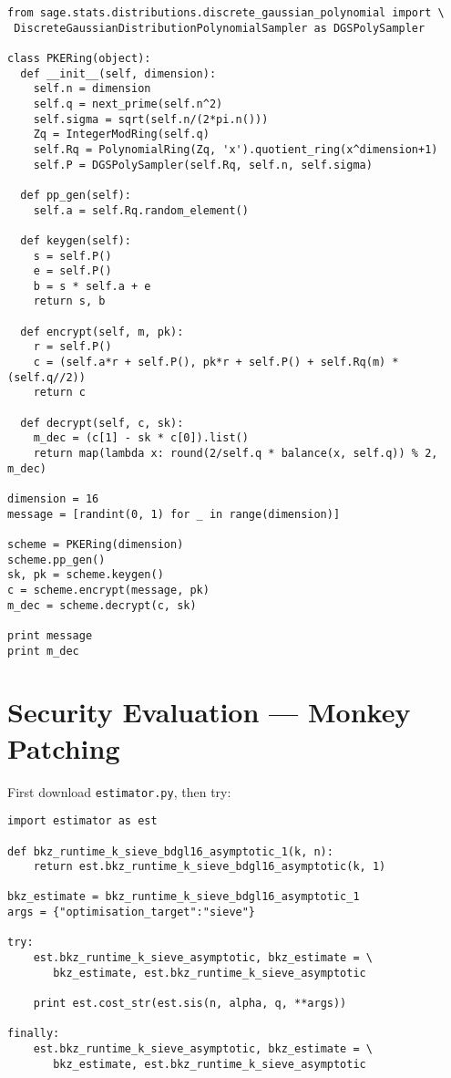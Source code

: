 \documentclass[10pt,a4paper,nobib]{tufte-handout}
\begin{document}
\lstset{language=sage,label= ,caption= ,captionpos=b,numbers=none}
\begin{lstlisting}
from sage.stats.distributions.discrete_gaussian_polynomial import \
 DiscreteGaussianDistributionPolynomialSampler as DGSPolySampler

class PKERing(object):
  def __init__(self, dimension):
    self.n = dimension
    self.q = next_prime(self.n^2)
    self.sigma = sqrt(self.n/(2*pi.n()))
    Zq = IntegerModRing(self.q)
    self.Rq = PolynomialRing(Zq, 'x').quotient_ring(x^dimension+1)
    self.P = DGSPolySampler(self.Rq, self.n, self.sigma)

  def pp_gen(self):
    self.a = self.Rq.random_element()

  def keygen(self):
    s = self.P()
    e = self.P()
    b = s * self.a + e
    return s, b

  def encrypt(self, m, pk):
    r = self.P()
    c = (self.a*r + self.P(), pk*r + self.P() + self.Rq(m) * (self.q//2))
    return c

  def decrypt(self, c, sk):
    m_dec = (c[1] - sk * c[0]).list()
    return map(lambda x: round(2/self.q * balance(x, self.q)) % 2, m_dec)

dimension = 16
message = [randint(0, 1) for _ in range(dimension)]

scheme = PKERing(dimension)
scheme.pp_gen()
sk, pk = scheme.keygen()
c = scheme.encrypt(message, pk)
m_dec = scheme.decrypt(c, sk)

print message
print m_dec
\end{lstlisting}

\section{Security Evaluation --- Monkey Patching}

First download \lstinline{estimator.py}, then try:

\begin{lstlisting}
import estimator as est

def bkz_runtime_k_sieve_bdgl16_asymptotic_1(k, n):
    return est.bkz_runtime_k_sieve_bdgl16_asymptotic(k, 1)

bkz_estimate = bkz_runtime_k_sieve_bdgl16_asymptotic_1
args = {"optimisation_target":"sieve"}

try:
    est.bkz_runtime_k_sieve_asymptotic, bkz_estimate = \
       bkz_estimate, est.bkz_runtime_k_sieve_asymptotic

    print est.cost_str(est.sis(n, alpha, q, **args))

finally:
    est.bkz_runtime_k_sieve_asymptotic, bkz_estimate = \
       bkz_estimate, est.bkz_runtime_k_sieve_asymptotic
\end{lstlisting}
\end{document}
